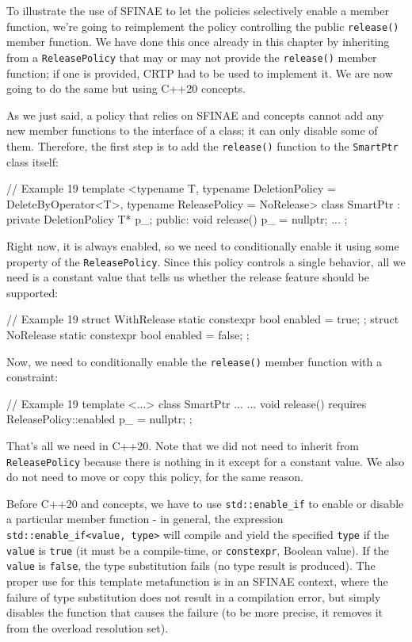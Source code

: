 To illustrate the use of SFINAE to let the policies selectively enable a member function, we're going to reimplement the policy controlling the public \texttt{release()} member function. We have done this once already in this chapter by inheriting from a \texttt{ReleasePolicy} that may or may not provide the \texttt{release()} member function; if one is provided, CRTP had to be used to implement it. We are now going to do the same but using C++20 concepts.

As we just said, a policy that relies on SFINAE and concepts cannot add any new member functions to the interface of a class; it can only disable some of them. Therefore, the first step is to add the \texttt{release()} function to the \texttt{SmartPtr} class itself:

\begin{code}
// Example 19
template <typename T,
          typename DeletionPolicy = DeleteByOperator<T>,
          typename ReleasePolicy = NoRelease>
class SmartPtr : private DeletionPolicy {
  T* p_;
  public:
  void release() { p_ = nullptr; }
  ...
};
\end{code}

Right now, it is always enabled, so we need to conditionally enable it using some property of the \texttt{ReleasePolicy}. Since this policy controls a single behavior, all we need is a constant value that tells us whether the release feature should be supported:

\begin{code}
// Example 19
struct WithRelease {
  static constexpr bool enabled = true;
};
struct NoRelease {
  static constexpr bool enabled = false;
};
\end{code}

Now, we need to conditionally enable the \texttt{release()} member function with a constraint:

\begin{code}
// Example 19
template <...> class SmartPtr ... {
  ...
  void release() requires ReleasePolicy::enabled {
    p_ = nullptr;
  }
};
\end{code}

That's all we need in C++20. Note that we did not need to inherit from \texttt{ReleasePolicy} because there is nothing in it except for a constant value. We also do not need to move or copy this policy, for the same reason.

Before C++20 and concepts, we have to use \texttt{std::enable\_if} to enable or disable a particular member function - in general, the expression \texttt{std::enable\_if\textless{}value,\ type\textgreater{}} will compile and yield the specified \texttt{type} if the \texttt{value} is \texttt{true} (it must be a compile-time, or \texttt{constexpr}, Boolean value). If the \texttt{value} is \texttt{false}, the type substitution fails (no type result is produced). The proper use for this template metafunction is in an SFINAE context, where the failure of type substitution does not result in a compilation error, but simply disables the function that causes the failure (to be more precise, it removes it from the overload resolution set).

